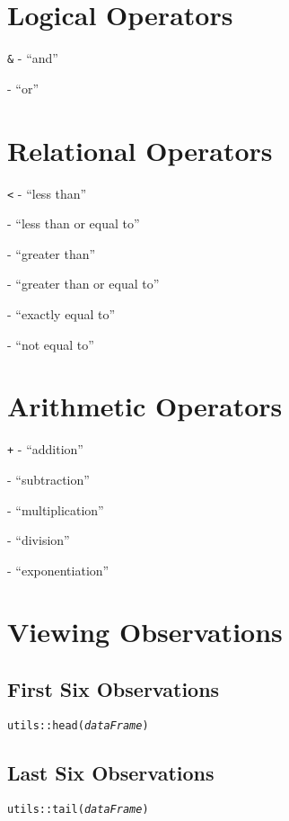 \documentclass{tufte-handout}
\begin{document}
\vspace{5mm}
\section{Logical Operators}
 {\color{red}\texttt{\&}} - ``and''
\par \noindent {\color{red}\texttt{|}} - ``or''

\vspace{5mm}
\section{Relational Operators}
 {\color{red}\texttt{<}} - ``less than''
\par \noindent {\color{red}\texttt{<=}} - ``less than or equal to''
\par \noindent {\color{red}\texttt{>}} - ``greater than''
\par \noindent {\color{red}\texttt{>=}} - ``greater than or equal to''
\par \noindent {\color{red}\texttt{==}} - ``exactly equal to''
\par \noindent {\color{red}\texttt{!=}} - ``not equal to''

\vspace{5mm}
\section{Arithmetic Operators}
 {\color{red}\texttt{+}} - ``addition''
\par \noindent {\color{red}\texttt{-}} - ``subtraction''
\par \noindent {\color{red}\texttt{*}} - ``multiplication''
\par \noindent {\color{red}\texttt{/}} - ``division''
\par \noindent {\color{red}\texttt{\^}} - ``exponentiation''

\vspace{5mm}
\section{Viewing Observations}
\subsection{First Six Observations}
\texttt{utils::}{\color{red}\texttt{head}}\texttt{(\textit{dataFrame})}

\vspace{3mm}
\subsection{Last Six Observations}
\texttt{utils::}{\color{red}\texttt{tail}}\texttt{(\textit{dataFrame})}
\end{document}
